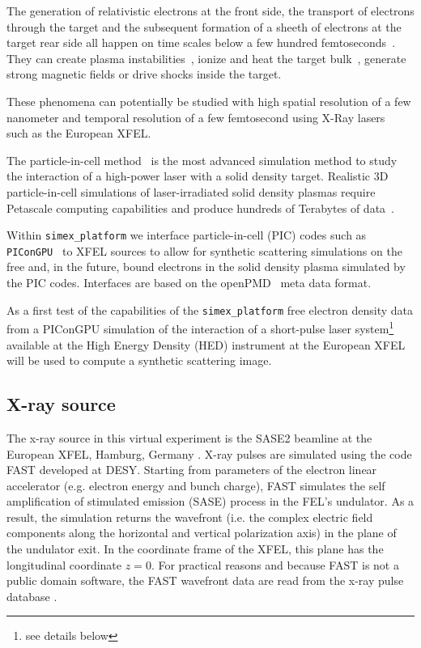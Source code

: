 \documentclass[a4paper]{article}
\begin{document}
The generation of relativistic electrons at the front side, the transport of electrons through the target and the subsequent formation of a sheeth of electrons at the target rear side all happen on time scales below a few hundred femtoseconds~\cite{Macchi2013}. They can create plasma instabilities~\cite{Metzkes2014}, ionize and heat the target bulk~\cite{Huang2013}, generate strong magnetic fields or drive shocks inside the target.

These phenomena can potentially be studied with high spatial resolution of a few nanometer and temporal resolution of a few femtosecond using X-Ray lasers~\cite{Kluge2014,Kluge2016} such as the European XFEL.

The particle-in-cell method~\cite{Birdsall2004} is the most advanced simulation method to study the interaction of a high-power laser with a solid density target. Realistic 3D particle-in-cell simulations of laser-irradiated solid density plasmas require Petascale computing capabilities and produce hundreds of Terabytes of data~\cite{ornl_picongpu}.

Within \texttt{simex\_platform} we interface particle-in-cell (PIC) codes such as \texttt{PIConGPU}~\cite{Bussmann2013, picongpu_github} to XFEL sources to allow for synthetic scattering simulations on the free and, in the future, bound electrons in the solid density plasma simulated by the PIC codes. Interfaces are based on the openPMD~\cite{openPMD} meta data format.

As a first test of the capabilities of the \texttt{simex\_platform} free electron density data from a PIConGPU simulation of the interaction of a short-pulse laser system\footnote{see details below} available at the High Energy Density (HED) instrument \cite{Nakatsutsumi2014} at the European XFEL will be used to compute a synthetic scattering image.
%
\subsection{X-ray source}
The x-ray source in this virtual experiment is the SASE2 beamline at the European XFEL, Hamburg, Germany \cite{Tschentscher2011}.
X-ray pulses are simulated using the code FAST \cite{Saldin1999} developed at DESY. Starting from parameters of the electron linear accelerator
(e.g. electron energy and bunch charge), FAST simulates the self amplification of stimulated emission (SASE) process \cite{} in the FEL's
undulator. As a result, the simulation returns the wavefront (i.e. the complex electric field components
along the horizontal and vertical polarization axis) in the plane of the undulator exit. In the coordinate frame of the
XFEL, this plane has the longitudinal coordinate $z=0$. For practical reasons and because FAST is not a public domain software,
the FAST wavefront data are read from the x-ray pulse database \cite{xpd_xfel}.
\end{document}

